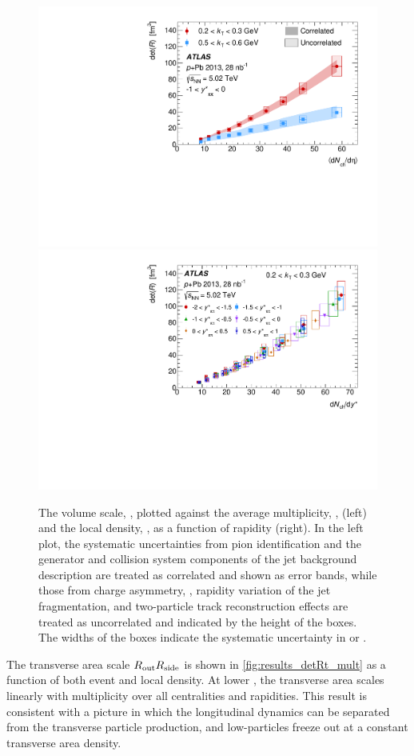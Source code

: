 \begin{figure}[ht]
\centering
\includegraphics[width=0.49\linewidth]{canqosl_detR_vs_avg_mult.pdf}
\includegraphics[width=0.49\linewidth]{canqosl_detR_kt1_vs_mult.pdf}
\caption{The volume scale, \detR, plotted against the average multiplicity, \avgdNdeta, (left) and the local density, \dNdy, as a function of rapidity (right). In the left plot, the systematic uncertainties from pion identification and the generator and collision system components of the jet background description are treated as correlated and shown as error bands, while those from charge asymmetry, \Reff, rapidity variation of the jet fragmentation, and two-particle track reconstruction effects are treated as uncorrelated and indicated by the height of the boxes. The widths of the boxes indicate the systematic uncertainty in \avgdNdeta or \dNdy.}
\label{fig:results_detR_dndeta}
\end{figure}

The transverse area scale $R_{\mathrm{out}}R_{\mathrm{side}}$ is shown in \cref{fig:results_detRt_mult} as a function of both event and local density. At lower \kt, the transverse area scales linearly with multiplicity over all centralities and rapidities. This result is consistent with a picture in which the longitudinal dynamics can be separated from the transverse particle production, and low-\kt particles freeze out at a constant transverse area density.


